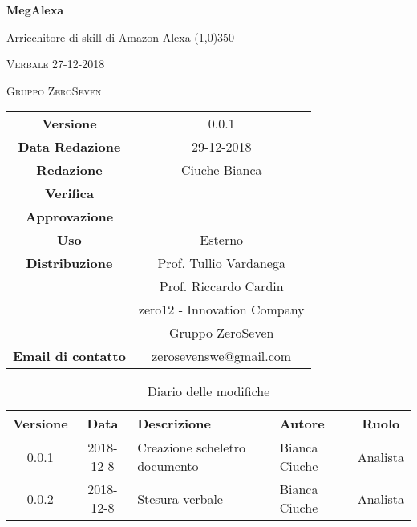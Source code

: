 \documentclass[a4paper,12pt]{article}
\author{Bianca Ciuche}
\date{27-12-2018}
\begin{document}
\begin{titlepage}
	\centering
	{\huge\bfseries MegAlexa\par}
	Arricchitore di skill di Amazon Alexa
	\line(1,0){350} \\
	{\scshape\LARGE Verbale 27-12-2018 \par}
	\vspace{1cm}
	{\scshape Gruppo ZeroSeven \par}
	\logo
	\begin{tabular}{c|c}
		{\hfill \textbf{Versione}} 			& 0.0.1				\\
		{\hfill\textbf{Data Redazione}} 	& 29-12-2018		\\ 
		{\hfill\textbf{Redazione}} 			&  		Ciuche Bianca		\\ 
		{\hfill\textbf{Verifica}} 				&  				\\ 
		{\hfill\textbf{Approvazione}} 		&  			\\ 
		{\hfill\textbf{Uso}} 					& 	Esterno	\\ 
		{\hfill\textbf{Distribuzione}} 			& 			Prof. Tullio Vardanega \\ & Prof. Riccardo Cardin \\ & zero12 - Innovation Company \\ & Gruppo ZeroSeven		\\ 
		{\hfill\textbf{Email di contatto}} & zerosevenswe@gmail.com \\
	\end{tabular}
\end{titlepage}
	
		\label{LastFrontPage}
	
	
	\newpage
	\cleardoublepage
	\begin{table}[tbph]
		\centering
		\begin{tabularx}{\textwidth}{|c|c|X|X|c|}
			\hline
			\textbf{Versione} & \textbf{Data} & \textbf{Descrizione} & \textbf{Autore} & \textbf{Ruolo} \\
			\hline
			0.0.1 & 2018-12-8 & Creazione scheletro documento
			& Bianca Ciuche & Analista\\
			\hline
			0.0.2 & 2018-12-8 & Stesura verbale & Bianca Ciuche &Analista \\
			\hline
		\end{tabularx}
		\caption{Diario delle modifiche}
	\end{table}
	
	\cleardoublepage
	\pagestyle{mymain}
	
	\tableofcontents
	\cleardoublepage
	
\end{document}
